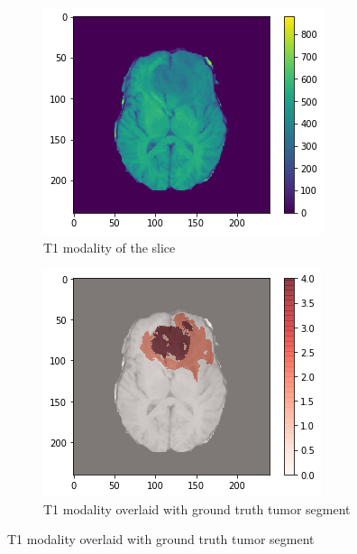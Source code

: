 \begin{figure}[H]
    \centering
    \begin{subfigure}[t]{.32\textwidth}
        \centering
        \includegraphics[width=\linewidth]{chapters/07_brats3d/images/01_t1.png}
        \caption{T1 modality of the slice}
    \end{subfigure}\hfill%
    \begin{subfigure}[t]{.315\textwidth}
        \centering
        \includegraphics[width=\linewidth]{chapters/07_brats3d/images/05_t1_segment.png}
        \caption{T1 modality overlaid with ground truth tumor segment}

\end{subfigure}
\end{figure}
